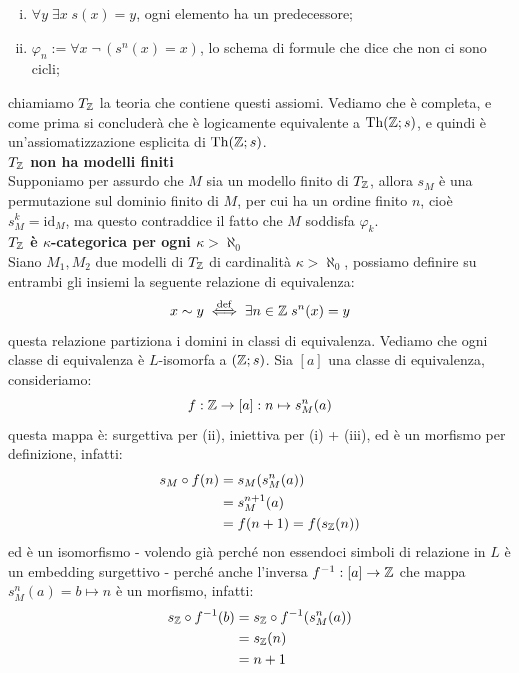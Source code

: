 \begin{soln}
\begin{enumerate}
\begin{enumerate}[(i)]
            \item $\forall y \; \exists x \; s(x) = y$, ogni elemento ha un predecessore;
            \item $\varphi_n := \forall x \; \neg\,(s^n(x) = x)$, lo schema di formule che dice che non ci sono cicli;
        \end{enumerate}
        chiamiamo $T_{\mathbb Z}$ la teoria che contiene questi assiomi. Vediamo che è completa, e come prima si concluderà che è logicamente equivalente a $\operatorname{Th}(\mathbb Z;s)$, e quindi è un'assiomatizzazione esplicita di $\operatorname{Th}(\mathbb Z;s)$.\\
        \textbf{$T_{\mathbb Z}$ non ha modelli finiti}\\
        Supponiamo per assurdo che $M$ sia un modello finito di $T_{\mathbb Z}$, allora $s_M$ è una permutazione sul dominio finito di $M$, per cui ha un ordine finito $n$, cioè $s_M^k = \mathrm{id}_M$, ma questo contraddice il fatto che $M$ soddisfa $\varphi_k$.\\
        \textbf{$T_{\mathbb Z}$ è $\kappa$-categorica per ogni $\kappa > \aleph_0$}\\
        Siano $M_1, M_2$ due modelli di $T_{\mathbb Z}$ di cardinalità $\kappa > \aleph_0$, possiamo definire su entrambi gli insiemi la seguente relazione di equivalenza:
        \[ x \sim y \overset{\mathrm{def}}{\iff} \exists n \in \mathbb Z \; s^n(x) = y \]
        questa relazione partiziona i domini in classi di equivalenza. Vediamo che ogni classe di equivalenza è $L$-isomorfa a $(\mathbb Z;s)$.
        Sia $[a]$ una classe di equivalenza, consideriamo:
        \[ f : \mathbb Z \to [a] : n \mapsto s_M^n(a) \]
        questa mappa è: surgettiva per (ii), iniettiva per (i) + (iii), ed è un morfismo per definizione, infatti:
        \begin{align*}
            s_M \circ f(n) &= s_M(s_M^n(a)) \\
                           &= s_M^{n+1}(a) \\
                           &= f(n+1) = f(s_{\mathbb Z}(n))
        \end{align*}
        ed è un isomorfismo - volendo già perché non essendoci simboli di relazione in $L$ è un embedding surgettivo - perché anche l'inversa $f^{-1} : [a] \to \mathbb Z$ che mappa $s_M^n(a) = b \mapsto n$ è un morfismo, infatti:
        \begin{align*}
            s_\ZZ \circ f^{-1}(b) &= s_\ZZ \circ f^{-1}(s_M^n(a)) \\
                                   &= s_\ZZ(n) \\
                                   &= n + 1 \\

\end{align*}
\end{enumerate}
\end{soln}
